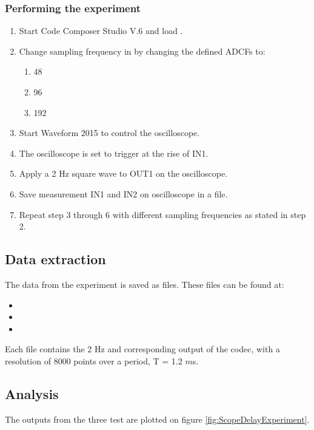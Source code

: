 \subsubsection{Performing the experiment}
\begin{enumerate}
	\item Start Code Composer Studio V.6 and load .
	\item Change sampling frequency in  by changing the defined ADCFs to:
	\begin{enumerate}
		\item 48
		\item 96
		\item 192
	\end{enumerate}
	\item Start Waveform 2015 to control the oscilloscope.
	\item The oscilloscope is set to trigger at the rise of IN1.
	\item Apply a 2 Hz square wave to OUT1 on the oscilloscope.
	\item Save measurement IN1 and IN2 on oscilloscope in a  file.
	\item Repeat step 3 through 6 with different sampling frequencies as stated in step 2.
\end{enumerate}

\subsection{Data extraction}

The data from the experiment is saved as  files. These files can be found at:
\begin{itemize}
	\item {}
	\item {}
	\item {}
\end{itemize}

Each file contains the 2 Hz and corresponding output of the codec, with a resolution of 8000 points over a period, T = 1.2 $m$s.


\subsection{Analysis}\label{sec:AnalysisFsDelay}
The outputs from the three test are plotted on figure \ref{fig:ScopeDelayExperiment}.

